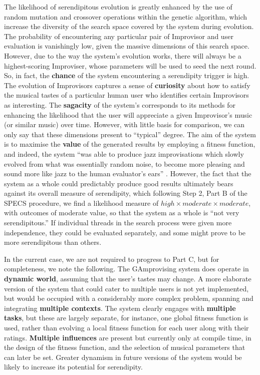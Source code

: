 The likelihood of serendipitous evolution is greatly enhanced by the
use of random mutation and crossover operations within the genetic
algorithm, which increase the diversity of the search space covered by
the system during evolution.  The probability of encountering any
particular pair of Improvisor and user evaluation is vanishingly low,
given the massive dimensions of this search space.  However, due to
the way the system's evolution works, there will always be a
highest-scoring Improviser, whose parameters will be used to seed the
next round.  So, in fact, the \textbf{chance} of the system
encountering a serendipity trigger is high.  The evolution of
Improvisors captures a sense of \textbf{curiosity} about how to
satisfy the musical tastes of a particular human user who identifies
certain Improvisors as interesting.  The \textbf{sagacity} of the
system's corresponds to its methods for enhancing the likelihood that
the user will appreciate a given Improvisor's music (or similar music)
over time.  However, with little basis for comparison, we can only say
that these dimensions present to ``typical'' degree.  The aim of the
system is to maximise the \textbf{value} of the generated results by
employing a fitness function, and indeed, the system ``was able to
produce jazz improvisations which slowly evolved from what was
essentially random noise, to become more pleasing and sound more like
jazz to the human evaluator's ears'' \cite{jordanous10}.  However, the
fact that the system as a whole could predictably produce good results
ultimately bears against its overall measure of serendipity, which
following Step 2, Part B of the SPECS procedure, we find a likelihood
measure of
$\mathit{high}\times\mathit{moderate}\times\mathit{moderate}$, with
outcomes of moderate value, so that the system as a whole is ``not
very serendipitous.''  If individual threads in the search process
were given more independence, they could be evaluated separately, and
some might prove to be more serendipitous than others.

In the current case, we are not required to progress to Part C, but
for completeness, we note the following.  The {\sf GAmprovising}
system does operate in \textbf{dynamic world}, assuming that the
user's tastes may change.  A more elaborate version of the system that
could cater to multiple users is not yet implemented, but would be
occupied with a considerably more complex problem, spanning and
integrating \textbf{multiple contexts}.  The system clearly engages
with \textbf{multiple tasks}, but these are largely separate, for
instance, one global fitness function is used, rather than evolving a
local fitness function for each user along with their ratings.
\textbf{Multiple influences} are present but currently only at compile
time, in the design of the fitness function, and the selection of
musical parameters that can later be set.  Greater dynamism in future
versions of the system would be likely to increase its potential for
serendipity.

